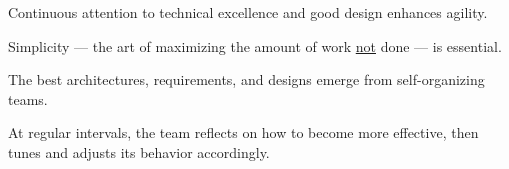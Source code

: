 \documentclass[11pt]{article}
\begin{document}
    \myspace
     Continuous attention to technical excellence and good design enhances agility.

    \myspace
     Simplicity --- the art of maximizing the amount of work \underline{not} done --- is essential.

    \myspace
     The best architectures, requirements, and designs emerge from self-organizing teams.

    \myspace
     At regular intervals, the team reflects on how to become more effective, then tunes and adjusts its behavior accordingly.
\end{document}
